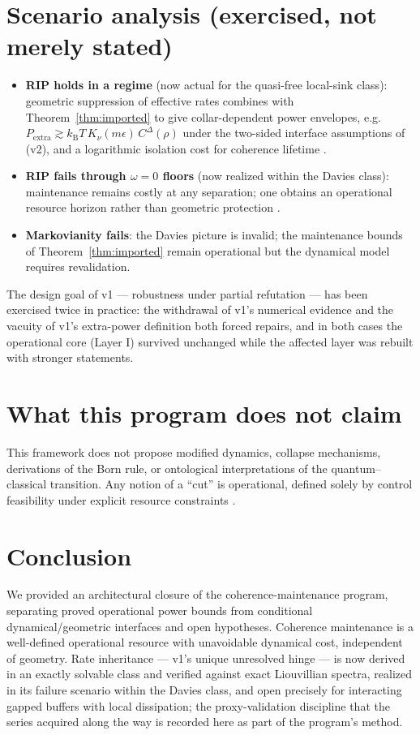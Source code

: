 \documentclass[11pt,a4paper]{article}
\theoremstyle{plain}
\theoremstyle{definition}
\theoremstyle{remark}
\newcommand{\kB}{k_{\mathrm{B}}}
\begin{document}
\section{Scenario analysis (exercised, not merely stated)}

\begin{itemize}
\item \textbf{RIP holds in a regime} (now actual for the quasi-free local-sink
class): geometric suppression of effective rates combines with
Theorem~\ref{thm:imported} to give collar-dependent power envelopes, e.g.\
$P_{\mathrm{extra}} \gtrsim \kB T\,K_\nu(m\epsilon)\,C^\Delta(\rho)$ under the
two-sided interface assumptions of \cite{MaintWork} (v2), and a logarithmic
isolation cost for coherence lifetime \cite{HCut}.
\item \textbf{RIP fails through $\omega = 0$ floors} (now realized within the
Davies class): maintenance remains costly at any separation; one obtains an
operational resource horizon rather than geometric protection
\cite{Stress}.
\item \textbf{Markovianity fails}: the Davies picture is invalid; the
maintenance bounds of Theorem~\ref{thm:imported} remain operational but the
dynamical model requires revalidation.
\end{itemize}

The design goal of v1 --- robustness under partial refutation --- has been
exercised twice in practice: the withdrawal of \cite{HCut} v1's numerical
evidence and the vacuity of \cite{MaintWork} v1's extra-power definition both
forced repairs, and in both cases the operational core (Layer I) survived
unchanged while the affected layer was rebuilt with stronger statements.

\section{What this program does not claim}

This framework does not propose modified dynamics, collapse mechanisms,
derivations of the Born rule, or ontological interpretations of the
quantum--classical transition. Any notion of a ``cut'' is operational, defined
solely by control feasibility under explicit resource constraints
\cite{HCut}.

\section{Conclusion}

We provided an architectural closure of the coherence-maintenance program,
separating proved operational power bounds from conditional
dynamical/geometric interfaces and open hypotheses. Coherence maintenance is a
well-defined operational resource with unavoidable dynamical cost, independent
of geometry. Rate inheritance --- v1's unique unresolved hinge --- is now
derived in an exactly solvable class and verified against exact Liouvillian
spectra, realized in its failure scenario within the Davies class, and open
precisely for interacting gapped buffers with local dissipation; the proxy-validation discipline that the series acquired along
the way is recorded here as part of the program's method.
\end{document}
